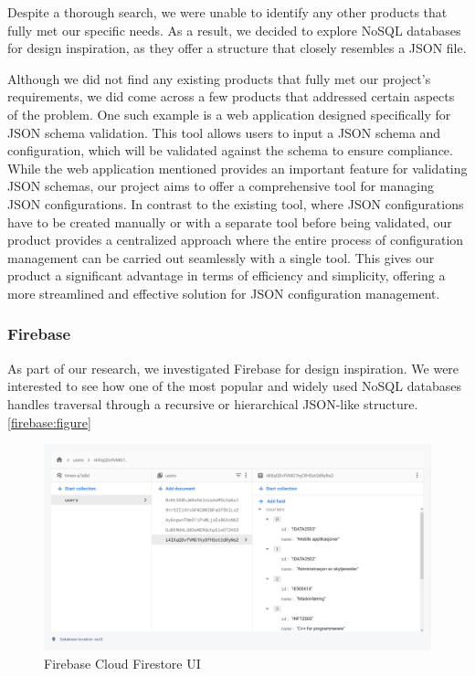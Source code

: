 \noindent
Despite a thorough search, we were unable to identify any other products that fully met our specific needs. As a result, we decided to explore NoSQL databases for design inspiration, as they offer a structure that closely resembles a JSON file. 

\noindent Although we did not find any existing products that fully met our project's requirements, we did come across a few products that addressed certain aspects of the problem. One such example is a web application designed specifically for JSON schema validation. This tool allows users to input a JSON schema and configuration, which will be validated against the schema to ensure compliance. While the web application mentioned provides an important feature for validating JSON schemas, our project aims to offer a comprehensive tool for managing JSON configurations. In contrast to the existing tool, where JSON configurations have to be created manually or with a separate tool before being validated, our product provides a centralized approach where the entire process of configuration management can be carried out seamlessly with a single tool. This gives our product a significant advantage in terms of efficiency and simplicity, offering a more streamlined and effective solution for JSON configuration management.

\subsubsection{Firebase}

As part of our research, we investigated Firebase for design inspiration. We were interested to see how one of the most popular and widely used NoSQL databases handles traversal through a recursive or hierarchical JSON-like structure. \autoref{firebase:figure}

\begin{figure}[!ht]
   \begin{minipage}{1\textwidth}
     \centering
     \includegraphics[width=.85\textwidth]{Figures/Firebase-console.pdf}
     \caption{Firebase Cloud Firestore UI}\label{firebase:figure}
   \end{minipage}\hfill
\end{figure}


